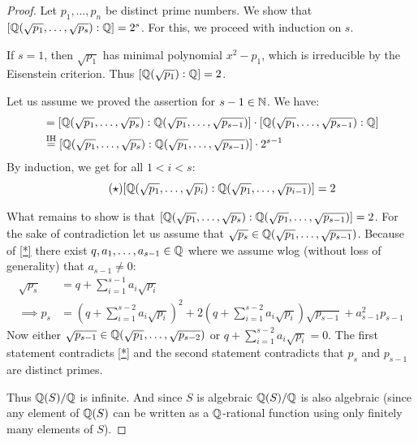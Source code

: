 \documentclass[twoside = false,	%
		headsepline,		%
		parskip = true,
		]{scrbook}						%
\begin{document}
        \begin{proof}
            Let $p_1,\dots,p_n$ be distinct prime numbers. We show that $[\mathbb Q(\sqrt{p_1},\dots,\sqrt{p_s}):\mathbb Q] = 2^s$. For this, we proceed with induction on $s$.
            
            If $s=1$, then $\sqrt{p_1}$ has minimal polynomial $x^2-p_1$, which is irreducible by the Eisenstein criterion. Thus $[\mathbb Q(\sqrt{p_1}):\mathbb Q] = 2$.
            
            Let us assume we proved the assertion for $s-1 \in \mathbb N$. We have:
            \begin{align*}
                [\Q(\sqrt{p_1},\dots,\sqrt{p_s}):\Q] &= [\Q(\sqrt{p_1},\dots,\sqrt{p_s}):\Q(\sqrt{p_1},\dots,\sqrt{p_{s-1}})] \cdot [\Q(\sqrt{p_1},\dots,\sqrt{p_{s-1}}):\Q] \\
                &\overset{\text{IH}}{=} [\Q(\sqrt{p_1},\dots,\sqrt{p_s}):\Q(\sqrt{p_1},\dots,\sqrt{p_{s-1}})] \cdot 2^{s-1}
            \end{align*}
            By induction, we get for all $1<i<s$:
            \begin{equation}\tag{$\star$}\label{*}
                [\mathbb Q(\sqrt{p_1},\dots,\sqrt{p_i}):\mathbb Q(\sqrt{p_1},\dots,\sqrt{p_{i-1}})] = 2
            \end{equation}
            
            What remains to show is that $[\mathbb Q(\sqrt{p_1},\dots,\sqrt{p_s}):\mathbb Q(\sqrt{p_1},\dots,\sqrt{p_{s-1}})] = 2$.
            For the sake of contradiction let us assume that $\sqrt{p_s} \in \mathbb Q(\sqrt{p_1},\dots,\sqrt{p_{s-1}})$. Because of \eqref{*} there exist $q,a_1,\dots,a_{s-1} \in \mathbb Q$ where we assume wlog (without loss of generality) that $a_{s-1} \neq 0$:
            \begin{align*}
                \sqrt{p_s} &= q + \sum_{i=1}^{s-1} a_i \sqrt{p_i} \\
                \implies p_s &= \left(q + \sum_{i=1}^{s-2} a_i \sqrt{p_i}\right)^2 + 2  \left(q + \sum_{i=1}^{s-2} a_i \sqrt{p_i}\right) \sqrt{p_{s-1}} + a_{s-1}^2 p_{s-1}
            \end{align*}
            Now either $\sqrt{p_{s-1}} \in \mathbb Q(\sqrt{p_1},\dots,\sqrt{p_{s-2}})$ or $q + \sum_{i=1}^{s-2} a_i \sqrt{p_i} = 0$. The first statement contradicts \eqref{*} and the second statement contradicts that $p_s$ and $p_{s-1}$ are distinct primes.
            
            Thus $\mathbb Q(S)/\mathbb Q$ is infinite. And since $S$ is algebraic $\mathbb Q(S)/\mathbb Q$ is also algebraic (since any element of $\mathbb Q(S)$ can be written as a $\mathbb Q$-rational function using only finitely many elements of $S$).
        \end{proof}
        
\end{document}
